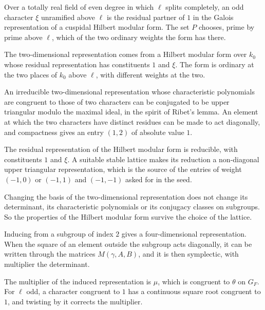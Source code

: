 Over a totally real field of even degree in which $\ell$ splits completely, an odd character $\xi$ unramified above $\ell$ is the residual partner of $1$ in the Galois representation of a cuspidal Hilbert modular form. The set $P$ chooses, prime by prime above $\ell$, which of the two ordinary weights the form has there.

The two-dimensional representation comes from a Hilbert modular form over $k_0$ whose residual representation has constituents $1$ and $\xi$. The form is ordinary at the two places of $k_0$ above $\ell$, with different weights at the two.

An irreducible two-dimensional representation whose characteristic polynomials are congruent to those of two characters can be conjugated to be upper triangular modulo the maximal ideal, in the spirit of Ribet's lemma. An element at which the two characters have distinct residues can be made to act diagonally, and compactness gives an entry $(1,2)$ of absolute value $1$.

The residual representation of the Hilbert modular form is reducible, with constituents $1$ and $\xi$. A suitable stable lattice makes its reduction a non-diagonal upper triangular representation, which is the source of the entries of weight $(-1,0)$ or $(-1,1)$ and $(-1,-1)$ asked for in the seed.

Changing the basis of the two-dimensional representation does not change its determinant, its characteristic polynomials or its conjugacy classes on subgroups. So the properties of the Hilbert modular form survive the choice of the lattice.

Inducing from a subgroup of index $2$ gives a four-dimensional representation. When the square of an element outside the subgroup acts diagonally, it can be written through the matrices $M(\gamma,A,B)$, and it is then symplectic, with multiplier the determinant.

The multiplier of the induced representation is $\mu$, which is congruent to $\theta$ on $G_F$. For $\ell$ odd, a character congruent to $1$ has a continuous square root congruent to $1$, and twisting by it corrects the multiplier.

